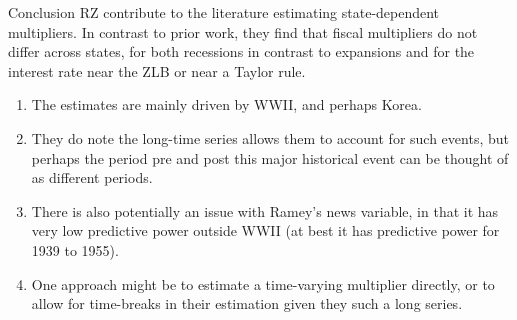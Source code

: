 \documentclass{beamer}
\begin{document}
\begin{frame}{Conclusion}
  RZ contribute to the literature estimating state-dependent multipliers. In contrast to prior work, they find that fiscal multipliers do not differ across states, for both recessions in contrast to expansions and for the interest rate near the ZLB or near a Taylor rule.
  \begin{enumerate}
    \item The estimates are mainly driven by WWII, and perhaps Korea.

    \item They do note the long-time series allows them to account for such events, but perhaps the period pre and post this major historical event can be thought of as different periods.

    \item There is also potentially an issue with Ramey's news variable, in that it has very low predictive power outside WWII (at best it has predictive power for 1939 to 1955).

    \item One approach might be to estimate a time-varying multiplier directly, or to allow for time-breaks in their estimation given they such a long series.
  \end{enumerate}
\end{frame}



\end{document}
